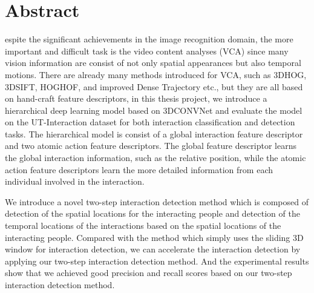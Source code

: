 %
%
%

\chapter*{Abstract}
\begin{SingleSpace}
espite the significant achievements in the image recognition domain, the more important and difficult task is the video content analyses (VCA) since many vision information are consist of not only spatial appearances but also temporal motions. There are already many methods introduced for VCA, such as 3DHOG, 3DSIFT, HOGHOF, and improved Dense Trajectory etc., but they are all based on hand-craft feature descriptors, in this thesis project, we introduce a hierarchical deep learning model based on 3DCONVNet and evaluate the model on the UT-Interaction dataset for both interaction classification and detection tasks. The hierarchical model is consist of a global interaction feature descriptor and two atomic action feature descriptors. The global feature descriptor learns the global interaction information, such as the relative position, while the atomic action feature descriptors learn the more detailed information from each individual involved in the interaction.  
\par 
We introduce a novel two-step interaction detection method which is composed of detection of the spatial locations for the interacting people and detection of the temporal locations of the interactions based on the spatial locations of the interacting people. Compared with the method which simply uses the sliding 3D window for interaction detection, we can accelerate the interaction detection by applying our two-step interaction detection method. And the experimental results show that we achieved good precision and recall scores based on our two-step interaction detection method.  
\end{SingleSpace}
\clearpage